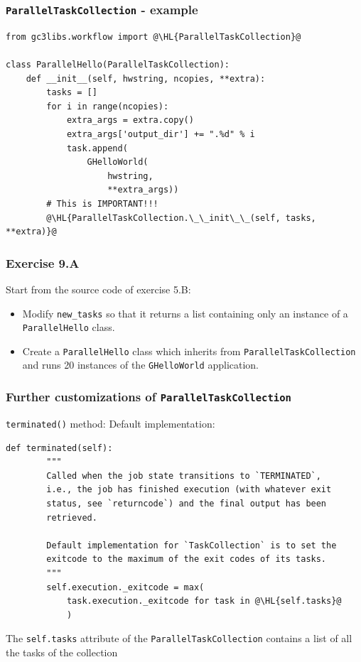 \documentclass[english,serif,mathserif,xcolor=pdftex,dvipsnames,table]{beamer}
\begin{document}
\begin{frame}[fragile]
  \frametitle{\texttt{ParallelTaskCollection} - example}
  \begin{lstlisting}[basicstyle=\tt\scriptsize]
from gc3libs.workflow import @\HL{ParallelTaskCollection}@

class ParallelHello(ParallelTaskCollection):
    def __init__(self, hwstring, ncopies, **extra):
        tasks = []
        for i in range(ncopies):
            extra_args = extra.copy()
            extra_args['output_dir'] += ".%d" % i
            task.append(
                GHelloWorld(
                    hwstring,
                    **extra_args))
        # This is IMPORTANT!!!
        @\HL{ParallelTaskCollection.\_\_init\_\_(self, tasks, **extra)}@
  \end{lstlisting}
\end{frame}

\begin{frame}
  \frametitle{Exercise 9.A}

  Start from the source code of exercise 5.B:
  \begin{itemize}
  \item Modify \lstinline|new_tasks| so that it returns a list
    containing only an instance of a \lstinline|ParallelHello| class.
  \item Create a \lstinline|ParallelHello| class which inherits from
    \lstinline|ParallelTaskCollection| and runs 20 instances of the
    \lstinline|GHelloWorld| application.
  \end{itemize}
\end{frame}

\begin{frame}[fragile]
  \frametitle{Further customizations of
    \texttt{ParallelTaskCollection}}
  \texttt{terminated()} method: Default implementation:
  \+
  \begin{lstlisting}[basicstyle=\tt\scriptsize]
    def terminated(self):
        """
        Called when the job state transitions to `TERMINATED`,
        i.e., the job has finished execution (with whatever exit
        status, see `returncode`) and the final output has been
        retrieved.

        Default implementation for `TaskCollection` is to set the
        exitcode to the maximum of the exit codes of its tasks.
        """
        self.execution._exitcode = max(
            task.execution._exitcode for task in @\HL{self.tasks}@
            )
          \end{lstlisting}
          The \lstinline|self.tasks| attribute of the
          \lstinline|ParallelTaskCollection| contains a list of all
          the tasks of the collection
\end{frame}
\end{document}

